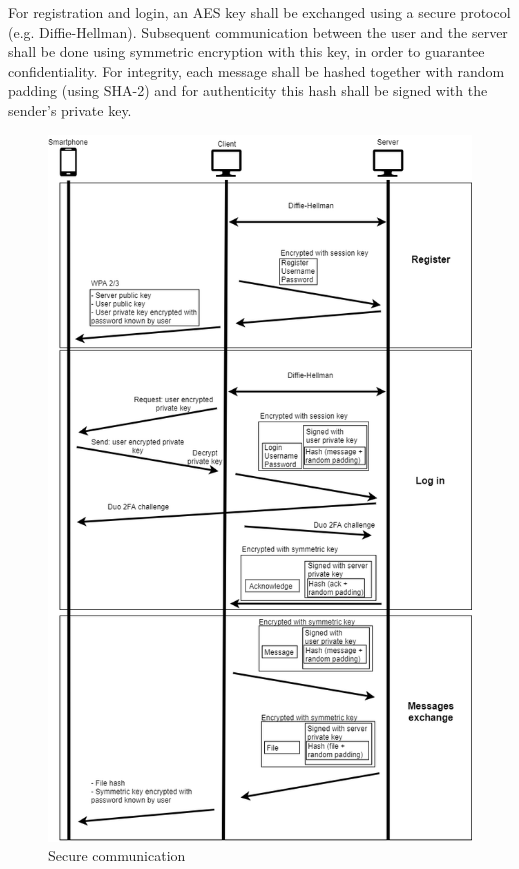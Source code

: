\documentclass[12pt]{article}
\begin{document}
For registration and login, an AES key shall be exchanged using a secure protocol (e.g. Diffie-Hellman). Subsequent communication between the user and the server shall be done using symmetric encryption with this key, in order to guarantee confidentiality. For integrity, each message shall be hashed together with random padding (using SHA-2) and for authenticity this hash shall be signed with the sender's private key.\par


\setcounter{figure}{0} %
\begin{figure}
\centering
\includegraphics[width=12cm]{secure_channel_2.png}
\caption{Secure communication}
\end{figure}
\end{document}

